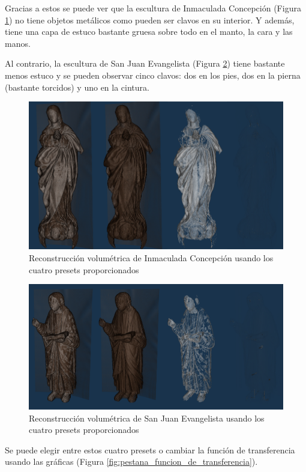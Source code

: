Gracias a estos se puede ver que la escultura de Inmaculada Concepción (Figura \ref{fig:inmaculada_concepcion}) no tiene objetos metálicos como pueden ser clavos en su interior. Y además, tiene una capa de estuco bastante gruesa sobre todo en el manto, la cara y las manos.

Al contrario, la escultura de San Juan Evangelista (Figura \ref{fig:san_juan_evangelista}) tiene bastante menos estuco y se pueden observar cinco clavos: dos en los pies, dos en la pierna (bastante torcidos) y uno en la cintura.

\begin{figure}[H]
	\centering
	\includegraphics[width=12cm]{imagenes/inmaculada_concepcion}
	\caption{Reconstrucción volumétrica de Inmaculada Concepción usando los cuatro presets proporcionados}
	\label{fig:inmaculada_concepcion}
\end{figure}

\begin{figure}[H]
	\centering
	\includegraphics[width=12cm]{imagenes/san_juan_evangelista}
	\caption{Reconstrucción volumétrica de San Juan Evangelista usando los cuatro presets proporcionados}
	\label{fig:san_juan_evangelista}
\end{figure}

Se puede elegir entre estos cuatro presets o cambiar la función de transferencia usando las gráficas (Figura \ref{fig:pestana_funcion_de_transferencia}).

